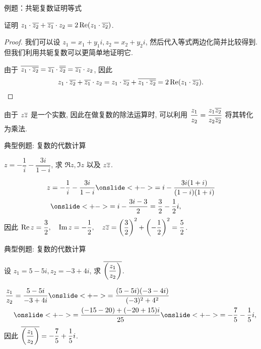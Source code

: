 \begin{frame}{例题：共轭复数证明等式}
\begin{example}
证明 $z_1\cdot\overline{z_2}+\overline{z_1}\cdot z_2=2\operatorname{Re}(z_1\cdot\overline{z_2})$.
\end{example}
\begin{proof}
\indent
我们可以设 $z_1=x_1+y_1i,z_2=x_2+y_2i$, 然后代入等式两边化简并比较得到.
\onslide<+->
但我们利用共轭复数可以更简单地证明它.

\indent
\onslide<+->
由于 $\overline{z_1\cdot\overline{z_2}}=\overline{z_1}\cdot\overline{\overline{z_2}}=\overline{z_1}\cdot z_2$, 
\onslide<+->
因此
\[z_1\cdot\overline{z_2}+\overline{z_1}\cdot z_2
=z_1\cdot\overline{z_2}+\overline{z_1\cdot\overline{z_2}}
=2\operatorname{Re}(z_1\cdot\overline{z_2}).\qedhere\]
\end{proof}
\onslide<+->
由于 $z\overline z$ 是一个实数,
\onslide<+->
因此在做复数的除法运算时, 可以利用
$\dfrac{z_1}{z_2}=\dfrac{z_1\overline{z_2}}{z_2\overline{z_2}}$
将其转化为乘法.
\end{frame}


\begin{frame}{典型例题: 复数的代数计算}
\begin{example}
$z=-\dfrac1i-\dfrac{3i}{1-i}$, 求 $\Re z,\Im z$ 以及 $z\overline z$.
\end{example}
\begin{solution}
\vspace{-\baselineskip}
\begin{align*}
z&=-\frac1i-\frac{3i}{1-i}
\onslide<+->{=i-\frac{3i(1+i)}{(1-i)(1+i)}}\\
&\onslide<+->{=i-\frac{3i-3}2=\frac32-\frac12i,}
\end{align*}
\onslide<+->
因此
$\displaystyle\operatorname{Re} z=\frac32,\quad\operatorname{Im} z=-\frac12,\quad
z\overline z=\left(\frac32\right)^2+\left(-\frac12\right)^2=\frac52$.
\end{solution}
\end{frame}


\begin{frame}{典型例题: 复数的代数计算}
\begin{example}
设 $z_1=5-5i,z_2=-3+4i$, 求 $\overline{\left(\dfrac{z_1}{z_2}\right)}$.
\end{example}
\begin{solution}
\vspace{-\baselineskip}
\begin{align*}
\frac{z_1}{z_2}&=\frac{5-5i}{-3+4i}
\onslide<+->{=\frac{(5-5i)(-3-4i)}{(-3)^2+4^2}}\\
&\onslide<+->{=\frac{(-15-20)+(-20+15)i}{25}}
\onslide<+->{=-\frac75-\frac15i,}
\end{align*}
\onslide<+->
因此 $\overline{\left(\dfrac{z_1}{z_2}\right)}=-\dfrac75+\dfrac15i$.
\end{solution}
\end{frame}


